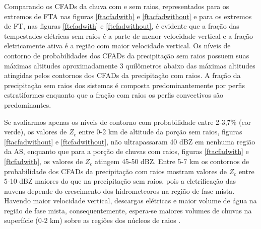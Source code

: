 Comparando os CFADs da chuva com e sem raios, representados para os extremos de FTA nas figuras \ref{ftacfadwith} e \ref{ftacfadwithout} e para os extremos de FT, nas figuras \ref{ftcfadwith} e \ref{ftcfadwithout}, é evidente que a fração das tempestades elétricas sem raios é a parte de menor velocidade vertical e a fração eletricamente ativa é a região com maior velocidade vertical. Os níveis de contorno de probabilidades dos CFADs da precipitação sem raios possuem suas máximas altitudes aproximadamente 3 quilômetros abaixo das máximas altitudes atingidas pelos contornos dos CFADs da precipitação com raios. A fração da precipitação sem raios dos sistemas é composta predominantemente por perfis estratiformes enquanto que a fração com raios os perfis convectivos são predominantes.




Se avaliarmos apenas os níveis de contorno com probabilidade entre 2-3,7\% (cor verde), os valores de $Z_c$ entre 0-2 km de altitude da porção sem raios, figuras \ref{ftacfadwithout} e \ref{ftcfadwithout}, não ultrapassaram 40 dBZ em nenhuma região da AS, enquanto que para a porção de chuvas com raios, figuras \ref{ftacfadwith} e \ref{ftcfadwith}, os valores de $Z_c$ atingem 45-50 dBZ. Entre 5-7 km os contornos de probabilidade dos CFADs da precipitação com raios mostram valores de $Z_c$ entre 5-10 dBZ maiores do que na precipitação sem raios, pois a eletrificação das nuvens depende do crescimento dos hidrometeoros na região de fase mista. Havendo maior velocidade vertical, descargas elétricas e maior volume de água na região de fase mista, consequentemente, espera-se maiores volumes de chuvas na superfície (0-2 km) sobre as regiões dos núcleos de raios \cite{Petersen1998}. 


